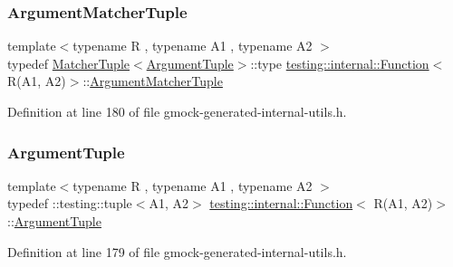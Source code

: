 \subsubsection{\texorpdfstring{Argument\+Matcher\+Tuple}{ArgumentMatcherTuple}}
{\footnotesize\ttfamily template$<$typename R , typename A1 , typename A2 $>$ \\
typedef \hyperlink{structtesting_1_1internal_1_1MatcherTuple}{Matcher\+Tuple}$<$\hyperlink{structtesting_1_1internal_1_1Function_3_01R_07_08_4_ad483c3128c470d8cdb55c3ac1c575c11}{Argument\+Tuple}$>$\+::type \hyperlink{structtesting_1_1internal_1_1Function}{testing\+::internal\+::\+Function}$<$ R(A1, A2)$>$\+::\hyperlink{structtesting_1_1internal_1_1Function_3_01R_07_08_4_a9bec5cf8937e8af99dedab2f40129fab}{Argument\+Matcher\+Tuple}}



Definition at line 180 of file gmock-\/generated-\/internal-\/utils.\+h.

\mbox{\label{structtesting_1_1internal_1_1Function_3_01R_07A1_00_01A2_08_4_a2de00437877c29ec6cb78396928b8e3e}} 
\subsubsection{\texorpdfstring{Argument\+Tuple}{ArgumentTuple}}
{\footnotesize\ttfamily template$<$typename R , typename A1 , typename A2 $>$ \\
typedef \+::testing\+::tuple$<$A1, A2$>$ \hyperlink{structtesting_1_1internal_1_1Function}{testing\+::internal\+::\+Function}$<$ R(A1, A2)$>$\+::\hyperlink{structtesting_1_1internal_1_1Function_3_01R_07_08_4_ad483c3128c470d8cdb55c3ac1c575c11}{Argument\+Tuple}}



Definition at line 179 of file gmock-\/generated-\/internal-\/utils.\+h.

\mbox{\label{structtesting_1_1internal_1_1Function_3_01R_07A1_00_01A2_08_4_a89033ea870fe831b13899ce36666e102}} 
